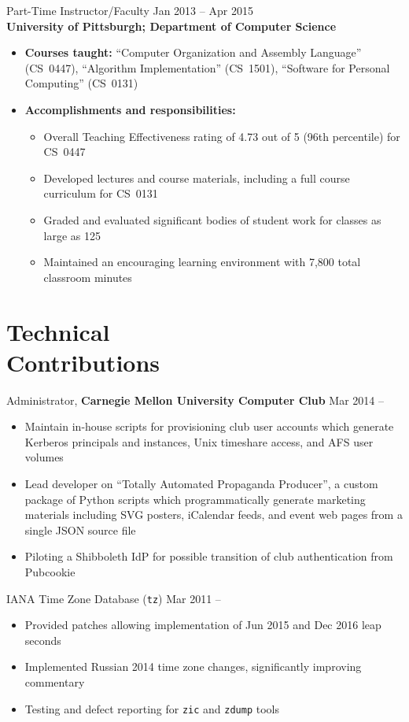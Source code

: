 \documentclass[11pt]{article}
\newcommand{\textdb}[1]{\fontseries{db}\selectfont#1\normalfont}
\newcommand{\present}{\phantom{Xxx 20XX}}
\begin{document}
\textdb{
Part-Time Instructor/Faculty
	\hfill Jan 2013 -- Apr 2015 \\
}
\textbf{University of Pittsburgh; Department of Computer Science}
\begin{itemize}
	\item \textbf{Courses taught:}
		``Computer Organization and Assembly Language'' (CS~0447),
		``Algorithm Implementation'' (CS~1501),
		``Software for Personal Computing'' (CS~0131)
	\item \textbf{Accomplishments and responsibilities:}
		\begin{itemize}
			\item Overall Teaching Effectiveness rating of 4.73 out of 5
				(96th percentile) for CS~0447
			\item Developed lectures and course materials,
				including a full course curriculum for CS~0131
			\item Graded and evaluated significant bodies of student work
				for classes as large as 125
			\item Maintained an encouraging learning environment
				with 7,800 total classroom minutes
		\end{itemize}
\end{itemize}



\section{Technical\\ Contributions}

\textdb{
Administrator,
\textbf{Carnegie Mellon University Computer Club}
	\hfill Mar 2014 -- \present
}
\begin{itemize}
	\item Maintain in-house scripts for provisioning club user accounts
		which generate Kerberos principals and instances,
		Unix timeshare access, and AFS user volumes
	\item Lead developer on ``Totally Automated Propaganda Producer'',
		a custom package of Python scripts
		which programmatically generate marketing materials
		including SVG posters, iCalendar feeds, and event web pages
		from a single JSON source file
	\item Piloting a Shibboleth IdP for possible transition
		of club authentication from Pubcookie
\end{itemize}

\textdb{
IANA Time Zone Database (\texttt{tz})
	\hfill Mar 2011 -- \present
}
\begin{itemize}
	\item Provided patches allowing implementation of Jun 2015 and Dec 2016 leap seconds
	\item Implemented Russian 2014 time zone changes,
		significantly improving commentary
	\item Testing and defect reporting for \texttt{zic} and \texttt{zdump} tools
\end{itemize}
\end{document}
